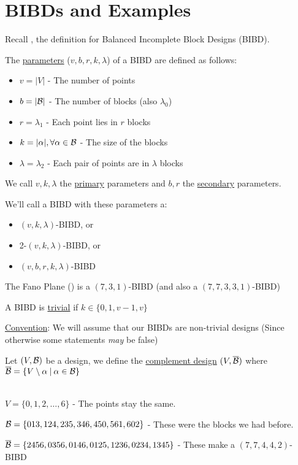 
\section{BIBDs and Examples}

Recall , the definition for Balanced Incomplete Block Designs (BIBD).

The \ul{parameters} ($v, b, r, k, \lambda$) of a BIBD are defined as follows:
\begin{itemize}
    \item $v = |V|$ - The number of points
    \item $b = |\mathcal{B}|$ - The number of blocks (also $\lambda_0$)
    \item $r = \lambda_1$ - Each point lies in $r$ blocks
    \item $k = |\alpha|, \forall \alpha \in \mathcal{B}$ - The size of the blocks
    \item $\lambda = \lambda_2$ - Each pair of points are in $\lambda$ blocks
\end{itemize}

We call $v, k, \lambda$ the \ul{primary} parameters and $b, r$ the \ul{secondary} parameters.

We'll call a BIBD with these parameters a:
\begin{itemize}
    \item $(v, k, \lambda)$-BIBD, or
    \item 2-$(v, k, \lambda)$-BIBD, or
    \item $(v, b, r, k, \lambda)$-BIBD
\end{itemize}

\begin{example}
    The Fano Plane () is a $(7,3,1)$-BIBD (and also a $(7,7,3,3,1)$-BIBD)
\end{example}

A BIBD is \ul{trivial} if $k \in \{0, 1, v-1, v\}$

\ul{Convention}: We will assume that our BIBDs are non-trivial designs (Since otherwise some statements \textit{may} be false)

\begin{definition}
    Let $(V, \mathcal{B})$ be a design, we define the \ul{complement design} $(V, \overline{\mathcal{B}})$ where $\overline{\mathcal{B}} = \{V \setminus \alpha \:|\: \alpha \in \mathcal{B} \}$ 
\end{definition}

\begin{example}
    ~\\
    $V = \{0, 1, 2, \ldots, 6\}$ - The points stay the same.

    $\mathcal{B} = \{013, 124, 235, 346, 450, 561, 602 \}$ - These were the blocks we had before.

    $\overline{\mathcal{B}} = \{2456, 0356, 0146, 0125, 1236, 0234, 1345 \}$ - These make a $(7, 7, 4, 4, 2)$-BIBD
\end{example}

